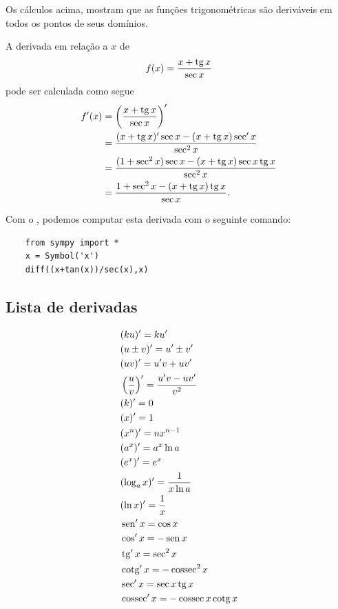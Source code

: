 \begin{obs}
  Os cálculos acima, mostram que as funções trigonométricas são deriváveis em todos os pontos de seus domínios.
\end{obs}

\begin{ex}
  A derivada em relação a $x$ de
  \begin{equation}
    f(x) = \frac{x + \operatorname{tg} x}{\sec x}
  \end{equation}
  pode ser calculada como segue
  \begin{align}
    f'(x) &= \left(\frac{x+\operatorname{tg} x}{\sec x}\right)' \\
          &= \frac{(x+\operatorname{tg} x)'\sec x - (x+\operatorname{tg} x)\sec' x}{\sec^2 x} \\
          &= \frac{(1+\sec^2 x)\sec x - (x+\operatorname{tg} x)\sec x\operatorname{tg} x}{\sec^2 x} \\
          &= \frac{1+\sec^2 x - (x+\operatorname{tg} x)\operatorname{tg} x}{\sec x}.
  \end{align}

  \ifispython
  Com o \sympy, podemos computar esta derivada com o seguinte comando:
\begin{lstlisting}
    from sympy import *
    x = Symbol('x')
    diff((x+tan(x))/sec(x),x)
  \end{lstlisting}
  \fi
\end{ex}

\subsection{Lista de derivadas}

\begin{align}
  & (ku)' = ku' \\
  & (u\pm v)' = u' \pm v'\\
  & (uv)' = u'v + uv' \\
  & \left(\frac{u}{v}\right)' = \frac{u'v - uv'}{v^2} \\
  & (k)' = 0\\
  & (x)' = 1\\
  & (x^n)' = nx^{n-1}\\
  & (a^x)' = a^x\ln a \\
  & (e^x)' = e^x \\
  & (\log_a x)' = \frac{1}{x\ln a}\\
  & (\ln x)' = \frac{1}{x}\\
  & \operatorname{sen}' x = \cos x \\
  & \cos' x = - \operatorname{sen} x\\
  & \operatorname{tg}' x = \sec^2 x \\
  & \operatorname{cotg}' x = -\operatorname{cossec}^2 x \\
  & \sec' x = \sec x \operatorname{tg} x \\
  & \operatorname{cossec}' x = -\operatorname{cossec} x\operatorname{cotg} x
\end{align}

